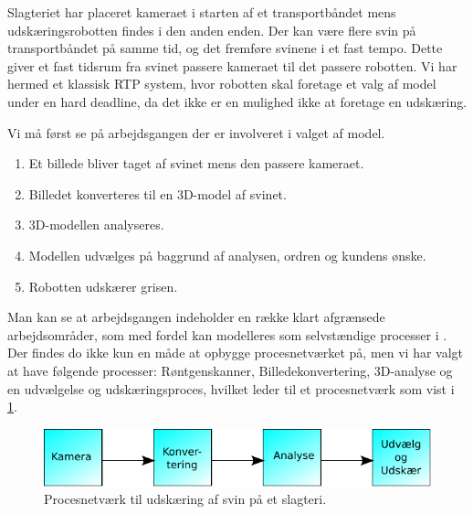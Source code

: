 Slagteriet har placeret kameraet i starten af et transportbåndet mens udskæringsrobotten findes i den anden enden. Der kan være flere svin på transportbåndet på samme tid, og det fremføre svinene i et fast tempo. Dette giver et fast tidsrum fra svinet passere kameraet til det passere robotten. Vi har hermed et klassisk RTP system, hvor robotten skal foretage et valg af model under en hard deadline, da det ikke er en mulighed ikke at foretage en udskæring.

Vi må først se på arbejdsgangen der er involveret i valget af model. 
\begin{enumerate}
\tightlist
	\item Et billede bliver taget af svinet mens den passere kameraet.
	\item Billedet konverteres til en 3D-model af svinet.
	\item 3D-modellen analyseres.
	\item Modellen udvælges på baggrund af analysen, ordren og kundens ønske.
	\item Robotten udskærer grisen.
\end{enumerate}

Man kan se at arbejdsgangen indeholder en  række klart afgrænsede arbejdsområder, som med fordel kan modelleres som selvstændige processer i \pycsp. Der findes do ikke kun en måde at opbygge procesnetværket på, men vi har valgt at have følgende processer: Røntgenskanner, Billedekonvertering, 3D-analyse og en udvælgelse og udskæringsproces, hvilket leder til et procesnetværk som vist i \cref{fig:pig-network}.

\begin{figure}
 \begin{center}
  \includegraphics[scale=1]{images/pig-network}
	\caption{Procesnetværk til udskæring af svin på et slagteri.}
	\label{fig:pig-network}
\end{center}
\end{figure}



